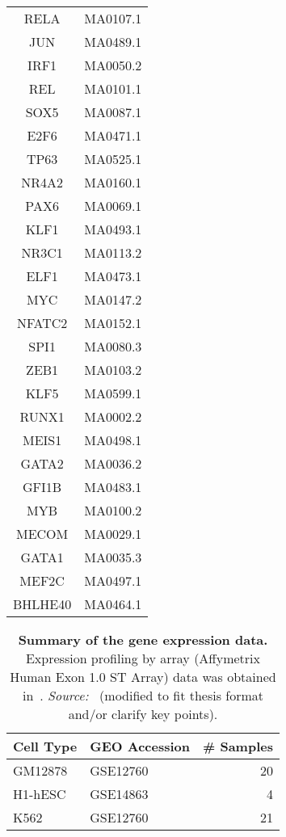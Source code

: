 \begin{multicols}{3}
{{\begin{longtable}{cc}
RELA & MA0107.1\\
JUN & MA0489.1\\
IRF1 & MA0050.2\\
REL & MA0101.1\\
SOX5 & MA0087.1\\
E2F6 & MA0471.1\\
TP63 & MA0525.1\\
NR4A2 & MA0160.1\\
PAX6 & MA0069.1\\
KLF1 & MA0493.1\\
NR3C1 & MA0113.2\\
ELF1 & MA0473.1\\
MYC & MA0147.2\\
NFATC2 & MA0152.1\\
SPI1 & MA0080.3\\
ZEB1 & MA0103.2\\
KLF5 & MA0599.1\\
RUNX1 & MA0002.2\\
MEIS1 & MA0498.1\\
GATA2 & MA0036.2\\
GFI1B & MA0483.1\\
MYB & MA0100.2\\
MECOM & MA0029.1\\
GATA1 & MA0035.3\\
MEF2C & MA0497.1\\
BHLHE40 & MA0464.1\\
        \hline
\end{longtable}
\unskip
\unpenalty
\unpenalty}
\unvbox\ltmcbox

}

\end{multicols}



\clearpage


\begin{table}[ht!]
\begin{center}
\caption[Summary of the gene expression data]{\textbf{Summary of the gene expression data.} Expression profiling by array (Affymetrix Human Exon 1.0 ST Array) data was obtained in~\cite{encode2012}. \emph{Source:~\cite{gusmao2016}} (modified to fit thesis format and/or clarify key points).}
\label{tab:data.expression}
    \renewcommand{\arraystretch}{1.2}
    \begin{tabular}{ llr }
        \hline
        Cell Type & GEO Accession & \# Samples \\
        \hline
        GM12878   & GSE12760 & 20 \\
        H1-hESC   & GSE14863 & 4  \\
        K562      & GSE12760 & 21 \\
        \hline
    \end{tabular}
\end{center}
\end{table}

\clearpage


